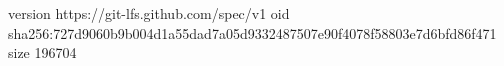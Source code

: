 version https://git-lfs.github.com/spec/v1
oid sha256:727d9060b9b004d1a55dad7a05d9332487507e90f4078f58803e7d6bfd86f471
size 196704
